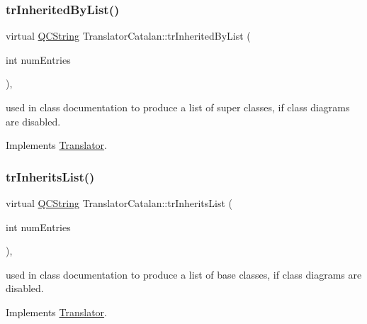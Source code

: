\mbox{\label{class_translator_catalan_aae342c2dd2c14e57f1ad959499d99c9c}} 
\subsubsection{\texorpdfstring{trInheritedByList()}{trInheritedByList()}}
{\footnotesize\ttfamily virtual \mbox{\hyperlink{class_q_c_string}{Q\+C\+String}} Translator\+Catalan\+::tr\+Inherited\+By\+List (\begin{DoxyParamCaption}\item[{int}]{num\+Entries }\end{DoxyParamCaption})\hspace{0.3cm}{\ttfamily [inline]}, {\ttfamily [virtual]}}

used in class documentation to produce a list of super classes, if class diagrams are disabled. 

Implements \mbox{\hyperlink{class_translator}{Translator}}.

\mbox{\label{class_translator_catalan_a3fe629ad436510759e16b9b275803a9c}} 
\subsubsection{\texorpdfstring{trInheritsList()}{trInheritsList()}}
{\footnotesize\ttfamily virtual \mbox{\hyperlink{class_q_c_string}{Q\+C\+String}} Translator\+Catalan\+::tr\+Inherits\+List (\begin{DoxyParamCaption}\item[{int}]{num\+Entries }\end{DoxyParamCaption})\hspace{0.3cm}{\ttfamily [inline]}, {\ttfamily [virtual]}}

used in class documentation to produce a list of base classes, if class diagrams are disabled. 

Implements \mbox{\hyperlink{class_translator}{Translator}}.

\mbox{\label{class_translator_catalan_a40f8915b8f604dae1db38a156aaa7d9d}} 
